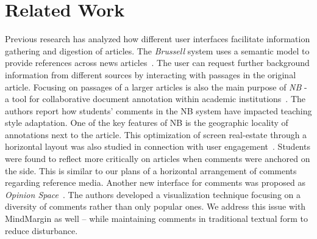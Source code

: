 \section{Related Work}

Previous research has analyzed how different user interfaces facilitate information gathering and digestion of articles. The \textit{Brussell} system uses a semantic model to provide references across news articles~\cite{NewsInterfaces}. The user can request further background information from different sources by interacting with passages in the original article. Focusing on passages of a larger articles is also the main purpose of \textit{NB} - a tool for collaborative document annotation within academic institutions~\cite{NB}. The authors report how students' comments in the NB system have impacted teaching style adaptation. One of the key features of NB is the geographic locality of annotations next to the article. This optimization of screen real-estate through a horizontal layout was also studied in connection with user engagement~\cite{AnnotationsStudents}. Students were found to reflect more critically on articles when comments were anchored on the side. This is similar to our plans of a horizontal arrangement of comments regarding reference media. 
Another new interface for comments was proposed as \textit{Opinion Space}~\cite{OpinionSpace}. The authors developed a visualization technique focusing on a diversity of comments rather than only popular ones. We address this issue with MindMargin as well -- while maintaining comments in traditional textual form to reduce disturbance. 


